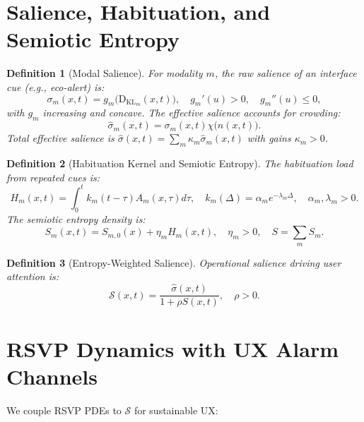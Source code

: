 \documentclass[openany]{book}
\newtheorem{definition}{Definition}[chapter]
\newcommand{\Sent}{S} %
\newcommand{\KL}{\mathrm{D}_{\mathrm{KL}}}
\begin{document}
\section{Salience, Habituation, and Semiotic Entropy}
\label{sec:rsvp-salience}
\begin{definition}[Modal Salience]
\label{def:salience}
For modality $m$, the \emph{raw salience} of an interface cue (e.g., eco-alert) is:
\begin{equation}
\label{eq:raw-salience}
\sigma_{m}(x,t) = g_m\big(\KL_{m}(x,t)\big), \quad g_m'(u) > 0, \quad g_m''(u) \leq 0,
\end{equation}
with $g_m$ increasing and concave. The \emph{effective salience} accounts for crowding:
\begin{equation}
\label{eq:eff-salience}
\widehat{\sigma}_{m}(x,t) = \sigma_{m}(x,t) \chi\big(n(x,t)\big).
\end{equation}
Total effective salience is $\widehat{\sigma}(x,t) = \sum_m \kappa_m \widehat{\sigma}_{m}(x,t)$ with gains $\kappa_m > 0$.
\end{definition}

\begin{definition}[Habituation Kernel and Semiotic Entropy]
\label{def:habituation}
The \emph{habituation load} from repeated cues is:
\begin{equation}
\label{eq:habituation}
H_m(x,t) = \int_{0}^{t} k_m(t-\tau) A_m(x,\tau) d\tau, \quad k_m(\Delta) = \alpha_m e^{-\lambda_m \Delta}, \quad \alpha_m, \lambda_m > 0.
\end{equation}
The \emph{semiotic entropy density} is:
\begin{equation}
\label{eq:semiotic-entropy}
\Sent_m(x,t) = S_{m,0}(x) + \eta_m H_m(x,t), \quad \eta_m > 0, \quad \Sent = \sum_m \Sent_m.
\end{equation}
\end{definition}

\begin{definition}[Entropy-Weighted Salience]
\label{def:entropy-weighted-salience}
Operational salience driving user attention is:
\begin{equation}
\label{eq:entropy-suppress}
\mathcal{S}(x,t) = \frac{\widehat{\sigma}(x,t)}{1 + \rho \Sent(x,t)}, \quad \rho > 0.
\end{equation}
\end{definition}

\section{RSVP Dynamics with UX Alarm Channels}
\label{sec:rsvp-dynamics}
We couple RSVP PDEs to $\mathcal{S}$ for sustainable UX:
\end{document}
